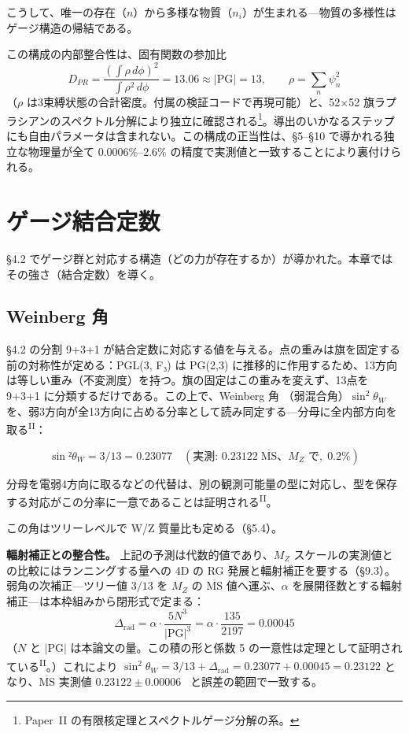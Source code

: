 \documentclass[fontsize=11pt,paper=a4,lualatex]{jlreq}
\newcommand{\PII}{\textsuperscript{\textup{II}}}
\begin{document}
こうして、唯一の存在（$n$）から多様な物質（$n_i$）が生まれる---物質の多様性はゲージ構造の帰結である。

この構成の内部整合性は、固有関数の参加比
\[D_{PR} = \frac{(\int\rho\,d\phi)^2}{\int\rho^2\,d\phi} = 13.06 \approx |\mathrm{PG}| = 13,\qquad \rho = \sum_n \psi_n^2\]
（$\rho$ は3束縛状態の合計密度。付属の検証コードで再現可能）と、52$\times$52 旗ラプラシアンのスペクトル分解により独立に確認される\footnote{Paper~II の有限核定理とスペクトルゲージ分解の系。}。導出のいかなるステップにも自由パラメータは含まれない。この構成の正当性は、§5--§10 で導かれる独立な物理量が全て 0.0006\%--2.6\% の精度で実測値と一致することにより裏付けられる。

\section{ゲージ結合定数}\label{sec:couplings}

§4.2 でゲージ群と対応する構造（どの力が存在するか）が導かれた。本章ではその強さ（結合定数）を導く。

\subsection{Weinberg 角}\label{weinberg-ux89d2}

§4.2 の分割 9+3+1
が結合定数に対応する値を与える。点の重みは旗を固定する前の対称性が定める：PGL(3, F₃) は PG(2,3)
に推移的に作用するため、13方向は等しい重み（不変測度）を持つ。旗の固定はこの重みを変えず、13点を 9+3+1 に分類するだけである。この上で、Weinberg 角 \cite{weinberg}（弱混合角）$\sin^2\!\theta_W$ を、弱3方向が全13方向に占める分率として読み同定する---分母に全内部方向を取る\PII{}：

\[\sin²θ_W = 3/13 = 0.23077 \quad (\text{実測: } 0.23122\;\overline{\mathrm{MS}}\text{、}M_Z\text{ で},\; 0.2\%)\]

分母を電弱4方向に取るなどの代替は、別の観測可能量の型に対応し、型を保存する対応がこの分率に一意であることは証明される\PII{}。

この角はツリーレベルで W/Z 質量比も定める（§5.4）。

\noindent\textbf{輻射補正との整合性。} 上記の予測は代数的値であり、$M_Z$ スケールの実測値との比較にはランニングする量への 4D の RG 発展と輻射補正を要する（§9.3）。弱角の次補正---ツリー値 $3/13$ を $M_Z$ の $\overline{\mathrm{MS}}$ 値へ運ぶ、$\alpha$ を展開径数とする輻射補正---は本枠組みから閉形式で定まる：
\[\Delta_\mathrm{rad} = \alpha\cdot\frac{5N^3}{|\mathrm{PG}|^3} = \alpha\cdot\frac{135}{2197} = 0.00045\]
（$N$ と $|\mathrm{PG}|$ は本論文の量。この積の形と係数 5 の一意性は定理として証明されている\PII{}。）これにより $\sin^2\!\theta_W = 3/13 + \Delta_\mathrm{rad} = 0.23077 + 0.00045 = 0.23122$ となり、$\overline{\mathrm{MS}}$ 実測値 $0.23122 \pm 0.00006$~\cite{pdg} と誤差の範囲で一致する。
\end{document}
